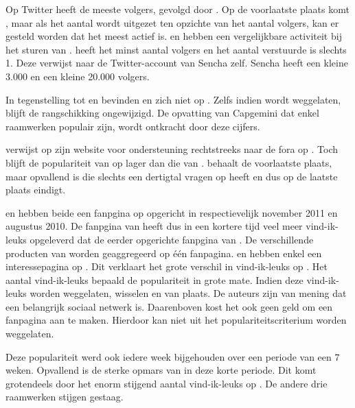 Op Twitter heeft \jqm{} de meeste volgers, gevolgd door \kendo.
Op de voorlaatste plaats komt \lungo{}, maar als het aantal  wordt uitgezet ten opzichte van het aantal volgers, kan er gesteld worden dat \lungo{} het meest actief is.
\jqm{} en \kendo{} hebben een vergelijkbare activiteit bij het sturen van .
\st{} heeft het minst aantal volgers en het aantal verstuurde  is slechts 1.
Deze  verwijst naar de Twitter-account van Sencha zelf.
Sencha heeft een kleine 3.000  en een kleine 20.000 volgers.

In tegenstelling tot \jqm{} en \lungo{} bevinden \kendo{} en \st{} zich niet op \gh{}.
Zelfs indien \gh{} wordt weggelaten, blijft de rangschikking ongewijzigd.
De opvatting van Capgemini dat enkel  raamwerken populair zijn, wordt ontkracht door deze cijfers.

\kendo{} verwijst op zijn website voor ondersteuning rechtstreeks naar de fora op \so{}. 
Toch blijft de populariteit van \kendo{} op \so{} lager dan die van \jqm{}.
\st{} behaalt de voorlaatste plaats, maar opvallend is \lungo{} die slechts een dertigtal vragen op \so{} heeft en dus op de laatste plaats eindigt.

\kendo{} en \jqm{} hebben beide een fanpgina op \fb{} opgericht in respectievelijk november 2011 en augustus 2010.
De fanpgina van \kendo{} heeft dus in een kortere tijd veel meer vind-ik-leuks opgeleverd dat de eerder opgerichte fanpgina van \jqm{}.
De verschillende producten van \kendo{} worden geaggregeerd op één fanpagina. 
\st{} en \lungo{} hebben enkel een interessepagina op \fb.
Dit verklaart het grote verschil in vind-ik-leuks op \fb.
Het aantal vind-ik-leuks bepaald de populariteit in grote mate.
Indien deze vind-ik-leuks worden weggelaten, wisselen \jqm{} en \kendo{} van plaats.
De auteurs zijn van mening dat \fb{} een belangrijk sociaal netwerk is.
Daarenboven kost het ook geen geld om een fanpagina aan te maken.
Hierdoor kan \fb{} niet uit het populariteitscriterium worden weggelaten.  

Deze populariteit werd ook iedere week bijgehouden over een periode van een $7$ weken.
Opvallend is de sterke opmars van \kendo{} in deze korte periode.
Dit komt grotendeels door het enorm stijgend aantal vind-ik-leuks op \fb{}.
De andere drie raamwerken stijgen gestaag.


